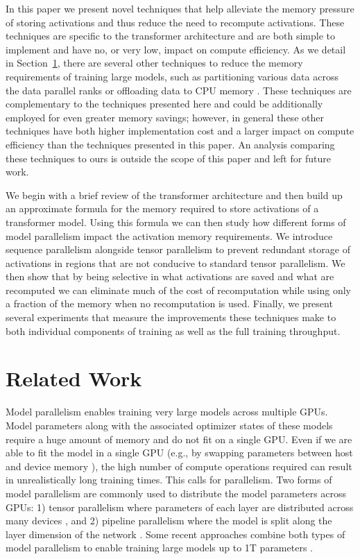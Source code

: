 \documentclass{article}
\begin{document}
In this paper we present novel techniques that help alleviate the memory pressure of storing activations and thus reduce the need to recompute activations. These techniques are specific to the transformer architecture and are both simple to implement and have no, or very low, impact on compute efficiency. As we detail in Section~\ref{sec:related-work}, there are several other techniques to reduce the memory requirements of training large models, such as partitioning various data across the data parallel ranks or offloading data to CPU memory \cite{zero,zero-offload}. These techniques are complementary to the techniques presented here and could be additionally employed for even greater memory savings; however, in general these other techniques have both higher implementation cost and a larger impact on compute efficiency than the techniques presented in this paper. An analysis comparing these techniques to ours is outside the scope of this paper and left for future work.

We begin with a brief review of the transformer architecture and then build up an approximate formula for the memory required to store activations of a transformer model. Using this formula we can then study how different forms of model parallelism impact the activation memory requirements. We introduce sequence parallelism alongside tensor parallelism to prevent redundant storage of activations in regions that are not conducive to standard tensor parallelism. We then show that by being selective in what activations are saved and what are recomputed we can eliminate much of the cost of recomputation while using only a fraction of the memory when no recomputation is used. Finally, we present several experiments that measure the improvements these techniques make to both individual components of training as well as the full training throughput.


\section {Related Work}
\label{sec:related-work}

Model parallelism enables training very large models across multiple GPUs. Model parameters along with the associated optimizer states of these models require a huge amount of memory and do not fit on a single GPU. Even if we are able to fit the model in a single GPU (e.g., by swapping parameters between host and device memory \cite{zero-offload}), the high number of compute operations required can result in unrealistically long training times. This calls for parallelism. Two forms of model parallelism are commonly used to distribute the model parameters across GPUs: 1) tensor parallelism where parameters of each layer are distributed across many devices \cite{mesh-tensorflow, megatron, GSPMD}, and 2) pipeline parallelism where the model is split along the layer dimension of the network \cite{gpipe,terapipe,pipedream}. Some recent approaches combine both types of model parallelism to enable training large models up to 1T parameters \cite{megatron-pipeline}.
\end{document}
